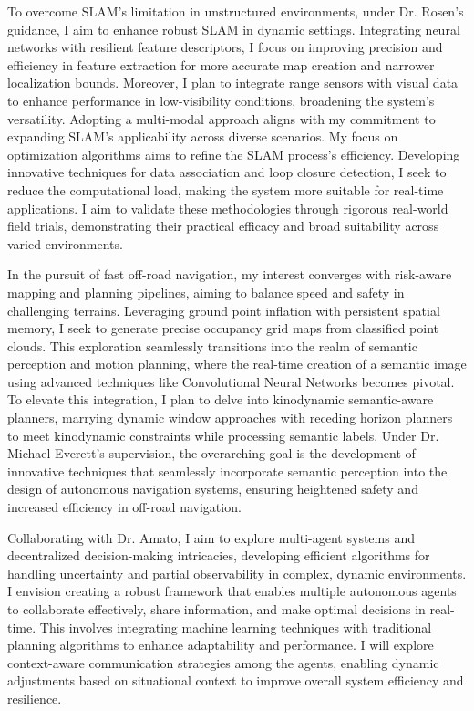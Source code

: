 \documentclass[a4,20pt]{article}
\begin{document}
\begin{large}
To overcome SLAM's limitation in unstructured environments, under Dr. Rosen's guidance, I aim to enhance robust SLAM in dynamic settings. Integrating neural networks with resilient feature descriptors, I focus on improving precision and efficiency in feature extraction for more accurate map creation and narrower localization bounds. Moreover, I plan to integrate range sensors with visual data to enhance performance in low-visibility conditions, broadening the system's versatility. Adopting a multi-modal approach aligns with my commitment to expanding SLAM's applicability across diverse scenarios. My focus on optimization algorithms aims to refine the SLAM process's efficiency. Developing innovative techniques for data association and loop closure detection, I seek to reduce the computational load, making the system more suitable for real-time applications. I aim to validate these methodologies through rigorous real-world field trials, demonstrating their practical efficacy and broad suitability across varied environments. 

In the pursuit of fast off-road navigation, my interest converges with risk-aware mapping and planning pipelines, aiming to balance speed and safety in challenging terrains. Leveraging ground point inflation with persistent spatial memory, I seek to generate precise occupancy grid maps from classified point clouds. This exploration seamlessly transitions into the realm of semantic perception and motion planning, where the real-time creation of a semantic image using advanced techniques like Convolutional Neural Networks becomes pivotal. To elevate this integration, I plan to delve into kinodynamic semantic-aware planners, marrying dynamic window approaches with receding horizon planners to meet kinodynamic constraints while processing semantic labels. Under Dr. Michael Everett's supervision, the overarching goal is the development of innovative techniques that seamlessly incorporate semantic perception into the design of autonomous navigation systems, ensuring heightened safety and increased efficiency in off-road navigation.

Collaborating with Dr. Amato, I aim to explore multi-agent systems and decentralized decision-making intricacies, developing efficient algorithms for handling uncertainty and partial observability in complex, dynamic environments. I envision creating a robust framework that enables multiple autonomous agents to collaborate effectively, share information, and make optimal decisions in real-time. This involves integrating machine learning techniques with traditional planning algorithms to enhance adaptability and performance.  I will explore context-aware communication strategies among the agents, enabling dynamic adjustments based on situational context to improve overall system efficiency and resilience.


\end{large}
\end{document}
